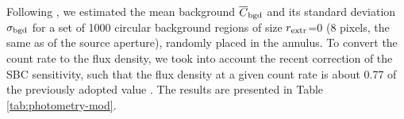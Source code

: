 \documentclass[pdftex,twocolumn]{aastex62}
\newcommand{\gp}[1]{{\color{blue} #1}}
\begin{document}
 

%
Following \citet{Guillot2019}, we estimated the mean background $\overline{C}_{\rm bgd}$ and its standard deviation $\sigma_{\rm bgd}$
for a set of 1000 circular background  
regions of size $r_{\rm extr}$=0 (8 pixels, the same as of the source aperture), randomly 
placed in the annulus. %
To convert the count rate to the flux density, we took into account the recent correction of the SBC sensitivity, such that 
the flux density at a given count rate is about 0.77 of the previously adopted value \citep{Avila2019}.
The results are presented in  
Table \ref{tab:photometry-mod}. 
\end{document}
